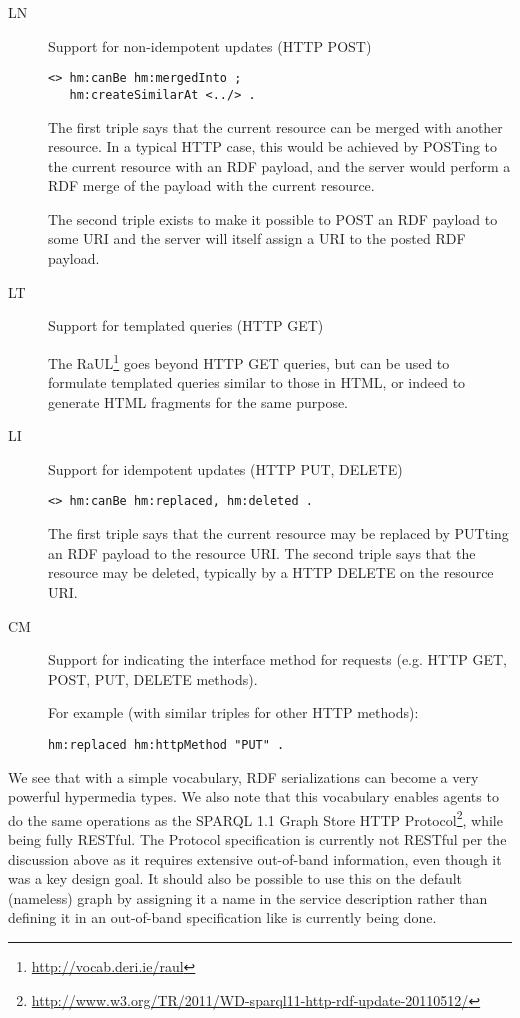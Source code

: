 \documentclass{llncs}
\begin{document}
\begin{description}

\item[\textsf{LN}] Support for non-idempotent updates (HTTP POST) 

\begin{verbatim}
<> hm:canBe hm:mergedInto ;
   hm:createSimilarAt <../> .
\end{verbatim}

The first triple says that the current resource can be merged with
another resource. In a typical HTTP case, this would be achieved by
POSTing to the current resource with an RDF payload, and the server
would perform a RDF merge of the payload with the current resource.

The second triple exists to make it possible to POST an RDF payload to
some URI and the server will itself assign a URI to the posted RDF
payload.


\item[\textsf{LT}] Support for templated queries (HTTP GET)

The RaUL\footnote{\url{http://vocab.deri.ie/raul}} goes beyond HTTP
GET queries, but can be used to formulate templated queries similar to
those in HTML, or indeed to generate HTML fragments for the same purpose.

\item[\textsf{LI}] Support for idempotent updates (HTTP PUT, DELETE) 

\begin{verbatim}
<> hm:canBe hm:replaced, hm:deleted .
\end{verbatim}

The first triple says that the current resource may be replaced by PUTting an RDF payload to the resource URI. The second
triple says that the resource may be deleted, typically by a HTTP
DELETE on the resource URI.


\item[\textsf{CM}] Support for indicating the interface method for requests
  (e.g. HTTP GET, POST, PUT, DELETE methods).

For example (with similar triples for other HTTP methods):
\begin{verbatim}
hm:replaced hm:httpMethod "PUT" .
\end{verbatim}

\end{description}

We see that with a simple vocabulary, RDF serializations can become a
very powerful hypermedia types. We also note that this vocabulary
enables agents to do the same operations as the SPARQL 1.1 Graph Store
HTTP
Protocol\footnote{\url{http://www.w3.org/TR/2011/WD-sparql11-http-rdf-update-20110512/}},
while being fully RESTful. The Protocol specification is currently not RESTful
per the discussion above as it requires extensive out-of-band information, even though it was a key design goal. It
should also be possible to use this on the default (nameless) graph by
assigning it a name in the service description rather than defining it
in an out-of-band specification like is currently being done.
\end{document}
